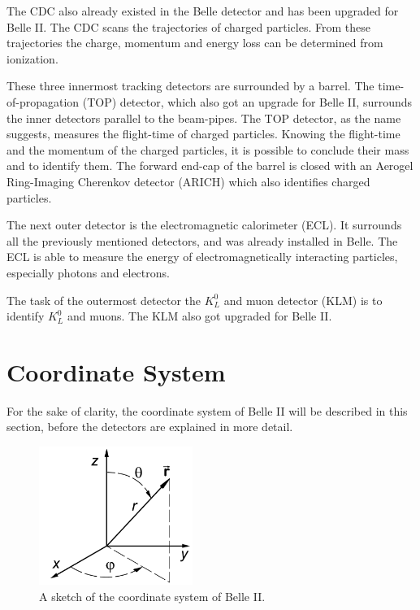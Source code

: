 \documentclass[a4paper,11pt,twosided,final,german,openbib,pdftex,listof=totoc,bibliography=totoc]{scrbook}
\begin{document}
The CDC also already existed in the Belle detector and has been upgraded for Belle II. The CDC scans the trajectories of charged particles. From these trajectories the charge, momentum and energy loss can be determined from ionization. 

These three innermost tracking detectors are surrounded by a barrel. The time-of-propagation (TOP) detector, which also got an upgrade for Belle II, surrounds the inner detectors parallel to the beam-pipes. The TOP detector, as the name suggests, measures the flight-time of charged particles. Knowing the flight-time and the momentum of the charged particles, it is possible to conclude their mass and to identify them. The forward end-cap of the barrel is closed with an Aerogel Ring-Imaging Cherenkov detector (ARICH) which also identifies charged particles.

The next outer detector is the electromagnetic calorimeter (ECL). It surrounds all the previously mentioned detectors, and was already installed in Belle. The ECL is able to measure the energy of electromagnetically interacting particles, especially photons and electrons.

The task of the outermost detector the $K_L^0$ and muon detector (KLM) is to identify $K_L^0$ and muons. The KLM also got upgraded for Belle II. \cite{B2B} 

\section{Coordinate System}

For the sake of clarity, the coordinate system of Belle II will be described in this section, before the detectors are explained in more detail.

\begin{figure}[h!]
	\begin{center}
		\includegraphics[width=5cm]{Bilder/coordinate.png}
	\end{center}
	\caption[Coordinate System Of Belle II]{A sketch of the coordinate system of Belle II. \cite{wiki:xxx}}
	\label{fig:CoordinateSysytem}
\end{figure}
\end{document}
